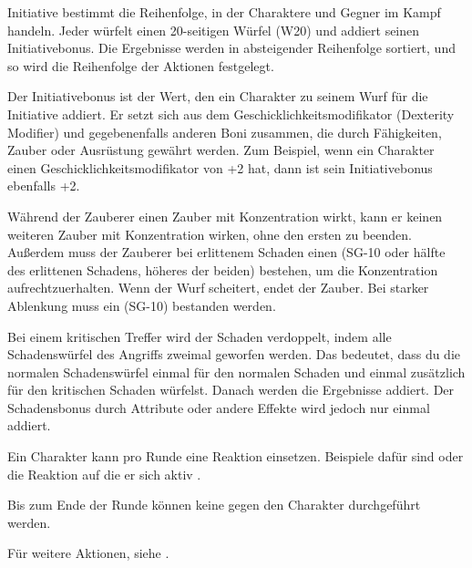 Initiative bestimmt die Reihenfolge, in der Charaktere und Gegner im Kampf handeln. Jeder würfelt einen 20-seitigen Würfel (W20) und addiert seinen Initiativebonus. Die Ergebnisse werden in absteigender Reihenfolge sortiert, und so wird die Reihenfolge der Aktionen festgelegt.

Der Initiativebonus ist der Wert, den ein Charakter zu seinem Wurf für die Initiative addiert. Er setzt sich aus dem Geschicklichkeitsmodifikator (Dexterity Modifier) und gegebenenfalls anderen Boni zusammen, die durch Fähigkeiten, Zauber oder Ausrüstung gewährt werden. Zum Beispiel, wenn ein Charakter einen Geschicklichkeitsmodifikator von +2 hat, dann ist sein Initiativebonus ebenfalls +2.



Während der Zauberer einen Zauber mit Konzentration wirkt, kann er keinen weiteren Zauber mit Konzentration wirken, ohne den ersten zu beenden. Außerdem muss der Zauberer bei erlittenem Schaden einen  (SG-10 oder hälfte des erlittenen Schadens, höheres der beiden) bestehen, um die Konzentration aufrechtzuerhalten. Wenn der Wurf scheitert, endet der Zauber. Bei starker Ablenkung muss ein  (SG-10) bestanden werden.



Bei einem kritischen Treffer wird der Schaden verdoppelt, indem alle Schadenswürfel des Angriffs zweimal geworfen werden. Das bedeutet, dass du die normalen Schadenswürfel einmal für den normalen Schaden und einmal zusätzlich für den kritischen Schaden würfelst. Danach werden die Ergebnisse addiert. Der Schadensbonus durch Attribute oder andere Effekte wird jedoch nur einmal addiert.



Ein Charakter kann pro Runde eine Reaktion einsetzen. Beispiele dafür sind  oder die Reaktion auf die er sich aktiv .



Bis zum Ende der Runde können keine  gegen den Charakter durchgeführt werden.

Für weitere Aktionen, siehe .



